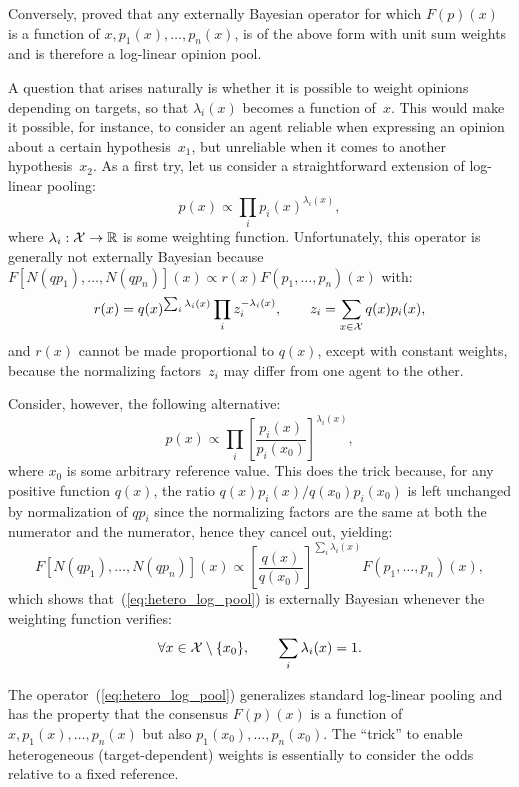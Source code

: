 \documentclass[english]{scrartcl}
\begin{document}
Conversely, \cite{Genest-86b} proved that any externally Bayesian operator for which $F(p)(x)$ is a function of $x,p_1(x),\ldots,p_n(x)$, is of the above form with unit sum weights and is therefore a log-linear opinion pool. 

A question that arises naturally is whether it is possible to weight opinions depending on targets, so that $\lambda_i(x)$ becomes a function of~$x$. This would make it possible, for instance, to consider an agent reliable when expressing an opinion about a certain hypothesis~$x_1$, but unreliable when it comes to another hypothesis~$x_2$. As a first try, let us consider a straightforward extension of log-linear pooling:
$$
p(x)\propto \prod_i p_i(x)^{\lambda_i(x)},
$$
where $\lambda_i : {\cal X}\to\mathbb{R}$ is some weighting function. Unfortunately, this operator is generally not externally Bayesian because $F[N(q p_1), \ldots, N(q p_n)](x)
\propto r(x) F(p_1,\ldots, p_n)(x)$ with:
$$
r(x) = q(x)^{\sum_i \lambda_i(x)} \prod_i z_i^{-\lambda_i(x)},
\qquad 
z_i = \sum_{x\in{\cal X}} q(x) p_i(x),
$$
and $r(x)$ cannot be made proportional to $q(x)$, except with constant weights, because the normalizing factors~$z_i$ may differ from one agent to the other.

Consider, however, the following alternative:
\begin{equation}
\label{eq:hetero_log_pool}
p(x) \propto \prod_i \left[\frac{p_i(x)}{p_i(x_0)}\right]^{\lambda_i(x)},    
\end{equation}
where $x_0$ is some arbitrary reference value. This does the trick because, for any positive function $q(x)$, the ratio $q(x)p_i(x)/q(x_0)p_i(x_0)$ is left unchanged by normalization of $q p_i$ since the normalizing factors are the same at both the numerator and the numerator, hence they cancel out, yielding:
$$
F[N(q p_1), \ldots, N(q p_n)](x)
\propto
\left[\frac{q(x)}{q(x_0)}\right]^{\sum_i \lambda_i(x)}
F(p_1, \ldots, p_n)(x),
$$
which shows that~(\ref{eq:hetero_log_pool}) is externally Bayesian whenever the weighting function verifies:
$$
\forall x \in {\cal X}\setminus \{x_0\},
\qquad
\sum_i \lambda_i(x) = 1.
$$

The operator~(\ref{eq:hetero_log_pool}) generalizes standard log-linear pooling and has the property that the consensus $F(p)(x)$ is a function of $x,p_1(x),\ldots,p_n(x)$ but also $p_1(x_0),\ldots,p_n(x_0)$. The ``trick'' to enable heterogeneous (target-dependent) weights is essentially to consider the odds relative to a fixed reference.



%



\end{document}

